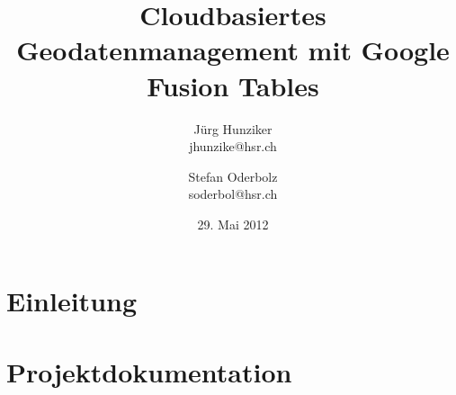


\title{Cloudbasiertes Geodatenmanagement mit Google Fusion Tables}
\author{Jürg Hunziker\\jhunzike@hsr.ch
		\and
		Stefan Oderbolz\\soderbol@hsr.ch}
\date{29. Mai 2012}






\listoftodos









\tableofcontents

\cleardoublepage


\part{Einleitung}


\cleardoublepage

\part{Projektdokumentation}


\cleardoublepage

